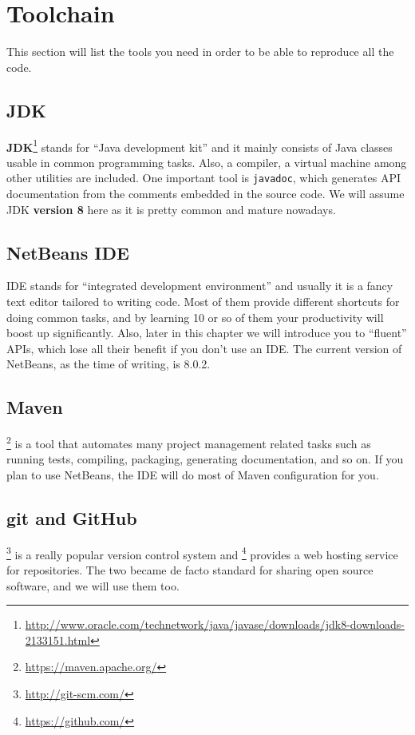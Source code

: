 \section{Toolchain}
This section will list the tools you need in order to be able to reproduce all the code.

\subsection{JDK}
\textbf{JDK}\footnote{\url{http://www.oracle.com/technetwork/java/javase/downloads/jdk8-downloads-2133151.html}} stands 
for ``Java development kit'' and it mainly consists of Java classes usable in common programming tasks. Also, a compiler, a virtual
machine among other utilities are included. One important tool is \texttt{javadoc}, which generates API documentation from the comments 
embedded in the source code. We will assume JDK \textbf{version 8} here as it is pretty common and mature nowadays.

\subsection{NetBeans IDE}
IDE stands for ``integrated development environment'' and usually it is a fancy text editor tailored to writing code. Most of them provide different shortcuts for
doing common tasks, and by learning 10 or so of them your productivity will boost up significantly. Also, later in this chapter we will introduce you to ``fluent'' APIs,
which lose all their benefit if you don't use an IDE. The current version of NetBeans, as the time of writing, is 8.0.2.

\subsection{Maven}
\Maven\footnote{\url{https://maven.apache.org/}} is a tool that automates many project management related tasks such as running tests, compiling,
packaging, generating documentation, and so on. If you plan to use NetBeans, the IDE will do most of Maven configuration for you.

\subsection{git and GitHub}
\git\footnote{\url{http://git-scm.com/}} is a really popular version control system and \GH\footnote{\url{https://github.com/}}  provides a web hosting service
for \git repositories. The two became de facto standard for sharing open source software, and we will use them too.

